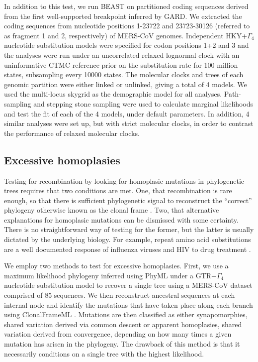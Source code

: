 \documentclass[11pt,oneside,letterpaper]{article}
\begin{document}
In addition to this test, we run BEAST \citep{drummond_2012} on partitioned coding sequences derived from the first well-supported breakpoint inferred by GARD.
We extracted the coding sequences from nucleotide positions 1-23722 and 23723-30126 (referred to as fragment 1 and 2, respectively) of MERS-CoV genomes.
Independent HKY+$\Gamma_{4}$ \citep{hky_1985,yang_1994} nucleotide substitution models were specified for codon positions 1+2 and 3 and the analyses were run under an uncorrelated relaxed lognormal clock with an uninformative CTMC reference prior \citep{ferreira_2008} on the substitution rate for 100 million states, subsampling every 10000 states.
The molecular clocks and trees of each genomic partition were either linked or unlinked, giving a total of 4 models.
We used the multi-locus skygrid \citep{gill_2013} as the demographic model for all analyses.
Path-sampling and stepping stone sampling \citep{baele_2012} were used to calculate marginal likelihoods and test the fit of each of the 4 models, under default parameters.
In addition, 4 similar analyses were set up, but with strict molecular clocks, in order to contrast the performance of relaxed molecular clocks.

\subsection*{Excessive homoplasies}
Testing for recombination by looking for homoplasic mutations in phylogenetic trees requires that two conditions are met.
One, that recombination is rare enough, so that there is sufficient phylogenetic signal to reconstruct the ``correct'' phylogeny otherwise known as the clonal frame \citep{milkman_1990}.
Two, that alternative explanations for homoplasic mutations can be dismissed with some certainty.
There is no straightforward way of testing for the former, but the latter is usually dictated by the underlying biology.
For example, repeat amino acid substitutions are a well documented response of influenza viruses and HIV to drug treatment \citep{gubareva_2001,tisdale_1993,boucher_1993}.

We employ two methods to test for excessive homoplasies.
First, we use a maximum likelihood phylogeny inferred using PhyML \citep{guindon_2003} under a GTR+$\Gamma_{4}$ \citep{tavare_1986,yang_1994} nucleotide substitution model to recover a single tree using a MERS-CoV dataset comprised of 85 sequences.
We then reconstruct ancestral sequences at each internal node and identify the mutations that have taken place along each branch using ClonalFrameML \citep{didelot_2007}.
Mutations are then classified as either synapomorphies, shared variation derived via common descent or apparent homoplasies, shared variation derived from convergence, depending on how many times a given mutation has arisen in the phylogeny.
The drawback of this method is that it necessarily conditions on a single tree with the highest likelihood.
\end{document}

